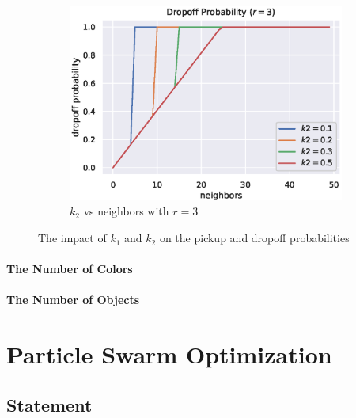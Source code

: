 \documentclass[12pt]{article}
\begin{document}
\begin{figure}[H]
\begin{subfigure}[b]{0.32\textwidth}
        \includegraphics[width=\textwidth]{figures/aca/k2-r3.eps}
        \caption{$k_2$ vs neighbors with $r=3$}
    \end{subfigure}
    \caption{The impact of $k_1$ and $k_2$ on the pickup and dropoff probabilities}\label{fig:aca:k1-k2}
\end{figure}
\paragraph{The Number of Colors}
\paragraph{The Number of Objects}

\section{Particle Swarm Optimization}

\subsection{Statement}
\end{document}
